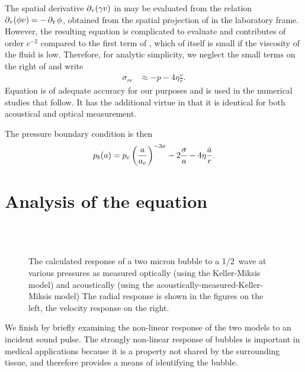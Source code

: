 The spatial derivative ${\operatorname{\partial}_r}(\gamma v) $ in  may be evaluated from the relation ${\operatorname{\partial}_r} (\phi v) = -\operatorname{\partial}_t \phi$, 
obtained from the spatial projection of   in the laboratory frame.
However, the resulting equation is complicated to evaluate and contributes of order $c^{-2}$ compared to the first term of ,
which of itself is small if the viscosity of the fluid is low.
Therefore,
for analytic simplicity, we neglect the small terms on the right of 
  and write
\begin{align}
 \sigma_{rr}  &\approx -p - 4\eta  \frac{v}{r}. \label{eqn:sigmarr4}
\end{align}
Equation  is of  adequate accuracy for our purposes and is used in the numerical studies that follow.
It has the additional virtue in that it is identical for both acoustical and optical measurement.

The pressure boundary condition is then
\begin{align}
  p_b(a) = p_e \left( \frac{a}{a_e} \right)^{-3\kappa} - 2\frac{\sigma}{a} - 4\eta  \frac{\dot a}{r}. 
\end{align}

\section{Analysis of the equation}
 \begin{figure}[p!]
      \\
      \\
      \caption{The calculated response of a two micron bubble to a \unit{1/2}\mega\hertz\ wave at various pressures
as measured optically (using the Keller-Miksis model) and acoustically (using the acoustically-measured-Keller-Miksis model)
      The radial response is shown in the figures on the left, the velocity response on the right.}
      \label{fig:BubbleResponse}
 \end{figure}
We finish by briefly examining the non-linear response of the two models to an incident sound pulse.
The strongly non-linear response of bubbles is important 
in medical applications because it is a property not  shared by the surrounding tissue,
and therefore provides a means of identifying the bubble.

